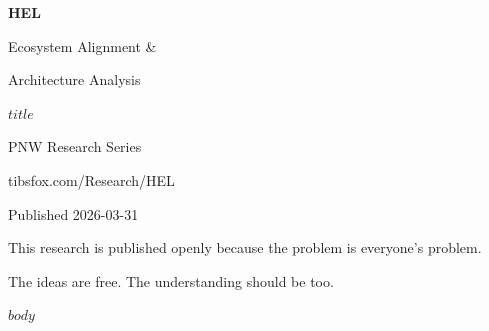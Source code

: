 \documentclass[11pt,a4paper]{article}
\begin{document}
\begin{titlepage}
\centering
\vspace*{3cm}
{\Huge\bfseries\sffamily\color{helaccent} HEL\par}
\vspace{0.5cm}
{\LARGE\sffamily Ecosystem Alignment \&\par Architecture Analysis\par}
\vspace{1cm}
{\Large\sffamily\color{helmuted} $title$\par}
\vspace{2cm}
{\large\sffamily PNW Research Series\par}
{\normalsize\sffamily tibsfox.com/Research/HEL\par}
\vspace{1cm}
{\normalsize\sffamily\color{helmuted} Published 2026-03-31\par}
\vfill
{\small\sffamily\color{helmuted} This research is published openly because the problem is everyone's problem.\par
The ideas are free. The understanding should be too.\par}
\end{titlepage}

$body$
\end{document}
